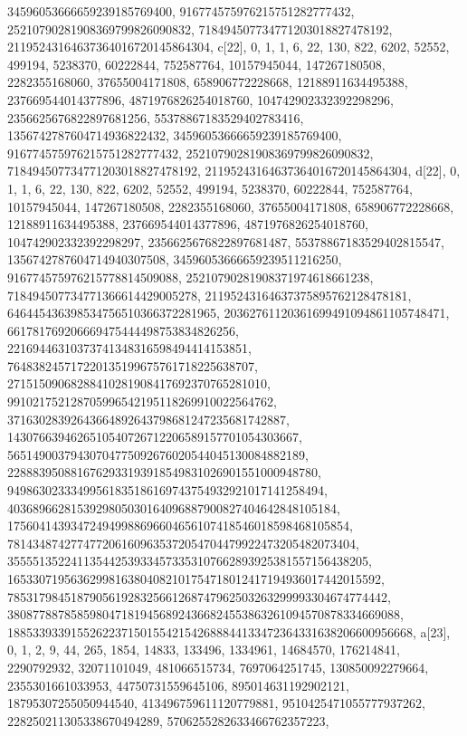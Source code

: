 {{{   34596053666659239185769400, 916774575976215751282777432, 
   25210790281908369799826090832, 718494507734771203018827478192, 
   21195243164637364016720145864304}}, 
 {c[22], {0, 1, 1, 6, 22, 130, 822, 6202, 52552, 499194, 5238370, 60222844, 
   752587764, 10157945044, 147267180508, 2282355168060, 37655004171808, 
   658906772228668, 12188911634495388, 237669544014377896, 
   4871976826254018760, 104742902332392298296, 2356625676822897681256, 
   55378867183529402783416, 1356742787604714936822432, 
   34596053666659239185769400, 916774575976215751282777432, 
   25210790281908369799826090832, 718494507734771203018827478192, 
   21195243164637364016720145864304}}, 
 {d[22], {0, 1, 1, 6, 22, 130, 822, 6202, 52552, 499194, 5238370, 60222844, 
   752587764, 10157945044, 147267180508, 2282355168060, 37655004171808, 
   658906772228668, 12188911634495388, 237669544014377896, 
   4871976826254018760, 104742902332392298297, 2356625676822897681487, 
   55378867183529402815547, 1356742787604714940307508, 
   34596053666659239511216250, 916774575976215778814509088, 
   25210790281908371974618661238, 718494507734771366614429005278, 
   21195243164637375895762128478181, 646445436398534756510366372281965, 
   20362761120361699491094861105748471, 661781769206669475444498753834826256, 
   22169446310373741348316598494414153851, 
   764838245717220135199675761718225638707, 
   27151509068288410281908417692370765281010, 
   991021752128705996542195118269910022564762, 
   37163028392643664892643798681247235681742887, 
   1430766394626510540726712206589157701054303667, 
   56514900379430704775092676020544045130084882189, 
   2288839508816762933193918549831026901551000948780, 
   94986302333499561835186169743754932921017141258494, 
   4036896628153929805030164096887900827404642848105184, 
   175604143934724949988696604656107418546018598468105854, 
   7814348742774772061609635372054704479922473205482073404, 
   355551352241135442539334573353107662893925381557156438205, 
   16533071956362998163804082101754718012417194936017442015592, 
   785317984518790561928325661268747962503263299993304674774442, 
   38087788785859804718194568924366824553863261094570878334669088, 
   1885339339155262237150155421542688844133472364331638206600956668}}, 
 {a[23], {0, 1, 2, 9, 44, 265, 1854, 14833, 133496, 1334961, 14684570, 
   176214841, 2290792932, 32071101049, 481066515734, 7697064251745, 
   130850092279664, 2355301661033953, 44750731559645106, 895014631192902121, 
   18795307255050944540, 413496759611120779881, 9510425471055777937262, 
   228250211305338670494289, 5706255282633466762357223, 
}}}

